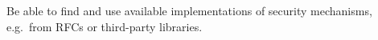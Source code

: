 \item Be able to find and use available implementations of security mechanisms, 
e.g.~from RFCs or third-party libraries.
